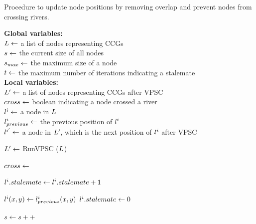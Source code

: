 \begin{algorithm}[tb!]
    \caption{Procedure to update node positions by removing overlap and prevent nodes from crossing rivers.}\label{alg:UpdateNodePosition}
    \textbf{Global variables:} \\
    $ L \gets $ a list of nodes representing CCGs \\
    $ s \gets $ the current size of all nodes \\
    $ s_{max} \gets $ the maximum size of a node \\
    $ t \gets $ the maximum number of iterations indicating a stalemate \\

    \textbf{Local variables:} \\
    $ L' \gets $ a list of nodes representing CCGs after VPSC \\
    $ cross \gets $ boolean indicating a node crossed a river \\
    $ l^i \gets $ a node in $ L $ \\
    $ l^i_{previous} \gets $ the previous position of $ l^i $\\
    $ l^{i'} \gets $ a node in $ L' $, which is the next position of $ l^i $ after VPSC \\

    \begin{algorithmic}[1]
        \While{$ \nodeSize < \nodeSizeMax $}

            \State $ L' \gets $ RunVPSC ($ L $)

            \ForEach {$ \nodeListVPSCEach \in \nodeListVPSC $}

                    \State $ cross \gets $ 

                        \State $ l^i.stalemate \gets l^i.stalemate + 1 $

                        \If{$ \nodeListEachStalemate < \stalemateMax $}
                            \State $ l^i(x,y) \gets l^i_{previous}(x,y) $
                        \Else
                            \State {}
                            \State $ l^i.stalemate \gets 0 $
                        \EndIf

                    \EndIf

                \EndIf

            \EndFor

            \State $ s \gets s ++$

        \EndWhile

        \EndProcedure
    \end{algorithmic}
\end{algorithm}


